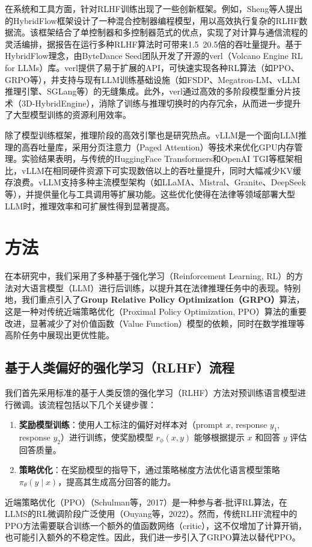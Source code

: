 \documentclass{pkuthesis}
\begin{document}
在系统和工具方面，针对RLHF训练出现了一些创新框架。例如，Sheng等人提出的HybridFlow框架设计了一种混合控制器编程模型，用以高效执行复杂的RLHF数据流。该框架结合了单控制器和多控制器范式的优点，实现了对计算与通信流程的灵活编排，据报告在运行多种RLHF算法时可带来1.5~20.5倍的吞吐量提升。基于HybridFlow理念，由ByteDance Seed团队开发了开源的verl（Volcano Engine RL for LLMs）库。verl提供了易于扩展的API，可快速实现各种RL算法（如PPO、GRPO等），并支持与现有LLM训练基础设施（如FSDP、Megatron-LM、vLLM推理引擎、SGLang等）的无缝集成。此外，verl通过高效的多阶段模型重分片技术（3D-HybridEngine），消除了训练与推理切换时的内存冗余，从而进一步提升了大型模型训练的资源利用效率。

除了模型训练框架，推理阶段的高效引擎也是研究热点。vLLM是一个面向LLM推理的高吞吐量库，采用分页注意力（Paged Attention）等技术来优化GPU内存管理。实验结果表明，与传统的HuggingFace Transformers和OpenAI TGI等框架相比，vLLM在相同硬件资源下可实现数倍以上的吞吐量提升，同时大幅减少KV缓存浪费。vLLM支持多种主流模型架构（如LLaMA、Mistral、Granite、DeepSeek等），并提供量化与工具调用等扩展功能。这些优化使得在法律等领域部署大型LLM时，推理效率和可扩展性得到显著提高。

\section{方法}
在本研究中，我们采用了多种基于强化学习（Reinforcement Learning, RL）的方法对大语言模型（LLM）进行后训练，以提升其在法律推理任务中的表现。特别地，我们重点引入了\textbf{Group Relative Policy Optimization（GRPO）}算法，这是一种对传统近端策略优化（Proximal Policy Optimization, PPO）算法的重要改进，显著减少了对价值函数（Value Function）模型的依赖，同时在数学推理等高阶任务中展现出更优性能。

\subsection{基于人类偏好的强化学习（RLHF）流程}
我们首先采用标准的基于人类反馈的强化学习（RLHF）方法对预训练语言模型进行微调。该流程包括以下几个关键步骤：
\begin{enumerate}
    \item \textbf{奖励模型训练}：使用人工标注的偏好对样本对（prompt $x$, response $y_1$, response $y_2$）进行训练，使奖励模型 $r_{\phi}(x, y)$ 能够根据提示 $x$ 和回答 $y$ 评估回答质量。
    \item \textbf{策略优化}：在奖励模型的指导下，通过策略梯度方法优化语言模型策略 $\pi_{\theta}(y \mid x)$，提高其生成高分回答的能力。
\end{enumerate}
近端策略优化（PPO）（Schulman等，2017）是一种参与者-批评RL算法，在LLMS的RL微调阶段广泛使用（Ouyang等，2022）。然而，传统RLHF流程中的PPO方法需要联合训练一个额外的值函数网络（critic），这不仅增加了计算开销，也可能引入额外的不稳定性。因此，我们进一步引入了GRPO算法以替代PPO。
\end{document}
